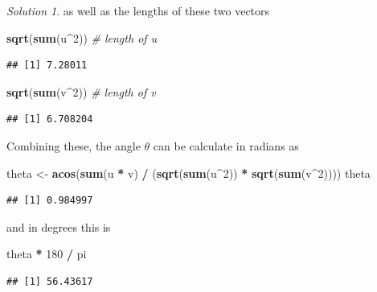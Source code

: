 \documentclass[
]{book}
\newenvironment{Shaded}{\begin{snugshade}}{\end{snugshade}}
\newcommand{\CommentTok}[1]{\textcolor[rgb]{0.56,0.35,0.01}{\textit{#1}}}
\newcommand{\DecValTok}[1]{\textcolor[rgb]{0.00,0.00,0.81}{#1}}
\newcommand{\KeywordTok}[1]{\textcolor[rgb]{0.13,0.29,0.53}{\textbf{#1}}}
\newcommand{\NormalTok}[1]{#1}
\newcommand{\OperatorTok}[1]{\textcolor[rgb]{0.81,0.36,0.00}{\textbf{#1}}}
\newcommand{\StringTok}[1]{\textcolor[rgb]{0.31,0.60,0.02}{#1}}
\theoremstyle{definition}
\theoremstyle{definition}
\theoremstyle{definition}
\theoremstyle{definition}
\theoremstyle{remark}
\newtheorem*{solution}{Solution}
\begin{document}
\begin{solution}
as well as the lengths of these two vectors

\begin{Shaded}
\begin{Highlighting}[]
\KeywordTok{sqrt}\NormalTok{(}\KeywordTok{sum}\NormalTok{(u}\OperatorTok{^}\DecValTok{2}\NormalTok{)) }\CommentTok{# length of u}
\end{Highlighting}
\end{Shaded}

\begin{verbatim}
## [1] 7.28011
\end{verbatim}

\begin{Shaded}
\begin{Highlighting}[]
\KeywordTok{sqrt}\NormalTok{(}\KeywordTok{sum}\NormalTok{(v}\OperatorTok{^}\DecValTok{2}\NormalTok{)) }\CommentTok{# length of v}
\end{Highlighting}
\end{Shaded}

\begin{verbatim}
## [1] 6.708204
\end{verbatim}

Combining these, the angle \(\theta\) can be calculate in radians as

\begin{Shaded}
\begin{Highlighting}[]
\NormalTok{theta <-}\StringTok{ }\KeywordTok{acos}\NormalTok{(}\KeywordTok{sum}\NormalTok{(u }\OperatorTok{*}\StringTok{ }\NormalTok{v) }\OperatorTok{/}\StringTok{ }\NormalTok{(}\KeywordTok{sqrt}\NormalTok{(}\KeywordTok{sum}\NormalTok{(u}\OperatorTok{^}\DecValTok{2}\NormalTok{)) }\OperatorTok{*}\StringTok{ }\KeywordTok{sqrt}\NormalTok{(}\KeywordTok{sum}\NormalTok{(v}\OperatorTok{^}\DecValTok{2}\NormalTok{))))}
\NormalTok{theta}
\end{Highlighting}
\end{Shaded}

\begin{verbatim}
## [1] 0.984997
\end{verbatim}

and in degrees this is

\begin{Shaded}
\begin{Highlighting}[]
\NormalTok{theta }\OperatorTok{*}\StringTok{ }\DecValTok{180} \OperatorTok{/}\StringTok{ }\NormalTok{pi}
\end{Highlighting}
\end{Shaded}

\begin{verbatim}
## [1] 56.43617
\end{verbatim}

\end{solution}
\end{document}
